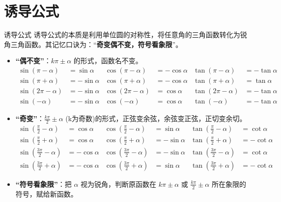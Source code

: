 \documentclass[a4paper,11pt]{ctexart}
\begin{document}
\section{诱导公式}

\begin{theorembox}{诱导公式}
诱导公式的本质是利用单位圆的对称性，将任意角的三角函数转化为锐角三角函数。其记忆口诀为：“\textbf{奇变偶不变，符号看象限}”。
\begin{itemize}
    \item \textbf{“偶不变”}：$k\pi \pm \alpha$ 的形式，函数名不变。
    \begin{align*}
        \sin(\pi - \alpha) &= \sin\alpha & \cos(\pi - \alpha) &= -\cos\alpha & \tan(\pi - \alpha) &= -\tan\alpha \\
        \sin(\pi + \alpha) &= -\sin\alpha & \cos(\pi + \alpha) &= -\cos\alpha & \tan(\pi + \alpha) &= \tan\alpha \\
        \sin(2\pi - \alpha) &= -\sin\alpha & \cos(2\pi - \alpha) &= \cos\alpha & \tan(2\pi - \alpha) &= -\tan\alpha \\
        \sin(-\alpha) &= -\sin\alpha & \cos(-\alpha) &= \cos\alpha & \tan(-\alpha) &= -\tan\alpha 
    \end{align*}
    \item \textbf{“奇变”}：$\frac{k\pi}{2} \pm \alpha$ (k为奇数)的形式，正弦变余弦，余弦变正弦，正切变余切。
    \begin{align*}
        \sin\left(\frac{\pi}{2} - \alpha\right) &= \cos\alpha & \cos\left(\frac{\pi}{2} - \alpha\right) &= \sin\alpha & \tan\left(\frac{\pi}{2} - \alpha\right) &= \cot\alpha \\
        \sin\left(\frac{\pi}{2} + \alpha\right) &= \cos\alpha & \cos\left(\frac{\pi}{2} + \alpha\right) &= -\sin\alpha & \tan\left(\frac{\pi}{2} + \alpha\right) &= -\cot\alpha \\
        \sin\left(\frac{3\pi}{2} - \alpha\right) &= -\cos\alpha & \cos\left(\frac{3\pi}{2} - \alpha\right) &= -\sin\alpha & \tan\left(\frac{3\pi}{2} - \alpha\right) &= \cot\alpha \\
        \sin\left(\frac{3\pi}{2} + \alpha\right) &= -\cos\alpha & \cos\left(\frac{3\pi}{2} + \alpha\right) &= \sin\alpha & \tan\left(\frac{3\pi}{2} + \alpha\right) &= -\cot\alpha 
    \end{align*}
    \item \textbf{“符号看象限”}：把 $\alpha$ 视为锐角，判断原函数在 $k\pi \pm \alpha$ 或 $\frac{k\pi}{2} \pm \alpha$ 所在象限的符号，赋给新函数。
\end{itemize}
\end{theorembox}
\end{document}

